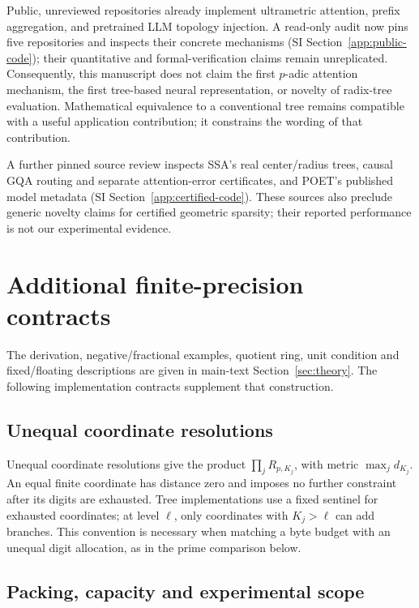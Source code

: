 \documentclass[11pt]{article}
\begin{document}
Public, unreviewed repositories already implement ultrametric attention, prefix
aggregation, and pretrained LLM topology injection. A read-only audit now pins
five repositories and inspects their concrete mechanisms
(SI Section~\ref{app:public-code}); their quantitative and formal-verification
claims remain unreplicated. Consequently, this manuscript does not claim the first
\(p\)-adic attention mechanism, the first tree-based neural representation,
or novelty of radix-tree evaluation. Mathematical equivalence to a conventional
tree remains compatible with a useful application contribution; it constrains
the wording of that contribution.

A further pinned source review inspects SSA's real center/radius trees,
causal GQA routing and separate attention-error certificates, and POET's
published model metadata (SI Section~\ref{app:certified-code}). These sources
also preclude generic novelty claims for certified geometric sparsity;
their reported performance is not our experimental evidence.


\section{Additional finite-precision contracts}
\label{si:precision}

The derivation, negative/fractional examples, quotient ring, unit condition
and fixed/floating descriptions are given in main-text
Section~\ref{sec:theory}. The following implementation contracts supplement
that construction.

\subsection{Unequal coordinate resolutions}

Unequal coordinate resolutions give the product
\(\prod_j R_{p,K_j}\), with metric \(\max_j d_{K_j}\). An equal finite coordinate
has distance zero and imposes no further constraint after its digits are
exhausted. Tree implementations use a fixed sentinel for exhausted coordinates;
at level \(\ell\), only coordinates with \(K_j>\ell\) can add branches.
This convention is necessary when matching a byte budget with an unequal
digit allocation, as in the prime comparison below.

\subsection{Packing, capacity and experimental scope}
\end{document}
